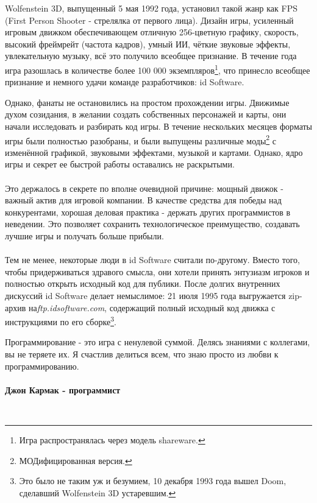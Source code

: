Wolfenstein 3D, выпущенный 5 мая 1992 года, установил такой жанр как FPS (First Person Shooter - стрелялка от первого лица). Дизайн игры, усиленный игровым движком обеспечивающем отличную 256-цветную графику, скорость, высокий фреймрейт (частота кадров), умный ИИ, чёткие звуковые эффекты, увлекательную музыку, всё это получило всеобщее признание. В течение года игра разошлась в количестве более 100 000 экземпляров\footnote{Игра распространялась через модель shareware.}, что принесло всеобщее признание и немного удачи команде разработчиков: id Software.\\
\par
\begin{figure}[H]
\centering
{}
\end{figure}
\par
Однако, фанаты не остановились на простом прохождении игры. Движимые духом созидания, в желании создать собственных персонажей и карты, они начали исследовать и разбирать код игры. В течение нескольких месяцев форматы игры были полностью разобраны, и были выпущены различные моды\footnote{МОДифицированная версия.} с изменённой графикой, звуковыми эффектами, музыкой и картами. Однако, ядро игры и секрет ее быстрой работы оставались не раскрытыми.\\
\\
Это держалось в секрете по вполне очевидной причине: мощный движок - важный актив для игровой компании. В качестве средства для победы над конкурентами, хорошая деловая практика - держать других программистов в неведении. Это позволяет сохранить технологическое преимущество, создавать лучшие игры и получать больше прибыли.\\
\\
Тем не менее, некоторые люди в id Software считали по-другому. Вместо того, чтобы придерживаться здравого смысла, они хотели принять энтузиазм игроков и полностью открыть исходный код для публики. После долгих внутренних дискуссий id Software делает немыслимое: 21 июля 1995 года выгружается zip-архив на\emph{ftp.idsoftware.com}, содержащий полный исходный код движка с инструкциями по его сборке\footnote{Это было не таким уж и безумием, 10 декабря 1993 года вышел Doom, сделавший Wolfenstein 3D устаревшим.}. \\
\par
 \begin{fancyquotes}
   Программирование - это игра с ненулевой суммой. Делясь знаниями с коллегами, вы не теряете их. Я счастлив делиться всем, что знаю просто из любви к программированию.\\
   \\
\textbf{Джон Кармак - программист}
 \end{fancyquotes}\\
